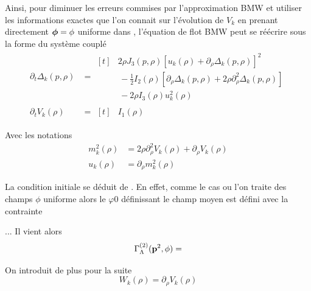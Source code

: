 \documentclass[10pt]{article}
\begin{document}
\begin{multicols}{2}
Ainsi, pour diminuer les erreurs commises par l'approximation BMW et utiliser les informations exactes que l'on connait sur l'évolution de $V_k$ en prenant directement $\boldsymbol{ \phi} = \phi$ uniforme dans , l'équation de flot BMW  peut se réécrire sous la forme du système couplé
\begin{align}
	\partial_t \Delta_k(p, \rho) & = 
	\begin{aligned}[t]
	 & 2\rho J_3(p,\rho){\left[u_k(\rho) + \partial_\rho \Delta_k (p,\rho) \right]}^{2} \\
	  & \, - \frac{1}{2}I_2(\rho) \left[\partial_\rho \Delta_k(p, \rho) +  2\rho \partial_\rho^2 \Delta_k(p,\rho) \right] \\
	 & \, - 2\rho I_3 (\rho) u_k^2(\rho) 
	 \end{aligned}
	\label{eqn:sys1}\\
	\partial_t V_k(\rho) & = 
	\begin{aligned}[t]
		& I_1(\rho)
	\end{aligned}
\end{align}

Avec les notations
\begin{equation}
 \begin{split}
	m_k^2(\rho) & = 2\rho \partial_\rho^2 V_k(\rho) + \partial_\rho V_k(\rho)  \\
	u_k(\rho)  & = \partial_\rho m^2_k(\rho)
	\end{split}	
\end{equation}

La condition initiale se déduit de . En effet, comme le cas ou l'on traite des champs $\phi$ uniforme alors le $\varphi0$ définissant le champ moyen est défini avec la contrainte

... 
Il vient alors
\begin{equation}
	\Gamma^{(2)}_\Lambda ({\bf p}^2, \phi) = 	
\end{equation}

On introduit de plus pour la suite
\begin{equation}
	W_k(\rho) = \partial_\rho V_k(\rho)
\end{equation}



\end{multicols}
\end{document}
